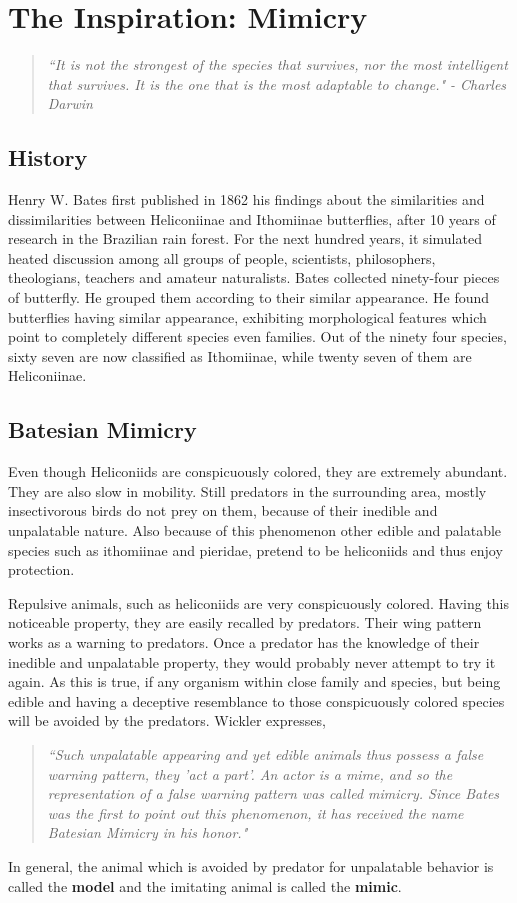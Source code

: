 \chapter{The Inspiration: Mimicry}

\begin{quote}
\textsl{``It is not the strongest of the species that survives, nor the most intelligent that survives. It is the one that is the most adaptable to change." - Charles Darwin}
\end{quote}

\section{History}
Henry W. Bates first published in 1862 his findings about the similarities and dissimilarities between Heliconiinae and Ithomiinae butterflies, after 10 years of research in the Brazilian rain forest. For the next hundred years, it simulated heated discussion among all groups of people, scientists, philosophers, theologians, teachers and amateur naturalists. Bates collected ninety-four pieces of butterfly. He grouped them according to their similar appearance. He found butterflies having similar appearance, exhibiting morphological features which point to completely different species even families. Out of the ninety four species, sixty seven are now classified as Ithomiinae, while twenty seven of them are Heliconiinae.

\section{Batesian Mimicry}
Even though Heliconiids are conspicuously colored, they are extremely abundant. They are also slow in mobility. Still predators in the surrounding area, mostly insectivorous birds do not prey on them, because of their inedible and unpalatable nature. Also because of this phenomenon other edible and palatable species such as ithomiinae and pieridae, pretend to be heliconiids and thus enjoy protection.

Repulsive animals, such as heliconiids are very conspicuously colored. Having this noticeable property, they are easily recalled by predators. Their wing pattern works as a warning to predators. Once a predator has the knowledge of their inedible and unpalatable property, they would probably never attempt to try it again. As this is true, if any organism within close family and species, but being edible and having a deceptive resemblance to those conspicuously colored species will be avoided by the predators. Wickler \cite{wickler1986} expresses,
\begin{quote}
\textsl{``Such unpalatable appearing and yet edible animals thus possess a false warning pattern, they 'act a part'. An actor is a mime, and so the representation of a false warning pattern was called \textit{mimicry}. Since Bates was the first to point out this phenomenon, it has received the name \textit{Batesian Mimicry} in his honor."}
\end{quote}
In general, the animal which is avoided by predator for unpalatable behavior is called the \textbf{model} and the imitating animal is called the \textbf{mimic}.

